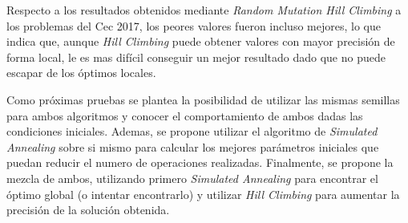 \documentclass[12pt,twoside]{article}
\begin{document}
Respecto a los resultados obtenidos mediante \textit{Random Mutation Hill Climbing} a los problemas del Cec 2017, los peores valores fueron incluso mejores, lo que indica que, aunque \textit{Hill Climbing} puede obtener valores con mayor precisión de forma local, le es mas difícil conseguir un mejor resultado dado que no puede escapar de los óptimos locales. 

Como próximas  pruebas se plantea la posibilidad de utilizar las mismas semillas para ambos algoritmos y conocer el comportamiento de ambos dadas las condiciones iniciales. Ademas, se propone utilizar el algoritmo de \textit{Simulated Annealing} sobre si mismo para calcular los mejores parámetros iniciales que puedan reducir el numero de operaciones realizadas. Finalmente, se propone la mezcla de ambos, utilizando primero \textit{Simulated Annealing} para encontrar el óptimo global (o intentar encontrarlo) y utilizar \textit{Hill Climbing} para aumentar la precisión de la solución obtenida.


	\clearpage
	
	
\end{document}
